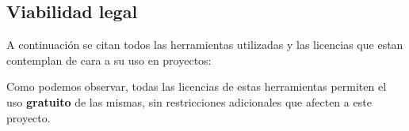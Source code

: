 \subsection{Viabilidad legal}
A continuación se citan todos las herramientas utilizadas y las licencias que estan contemplan de cara a su uso en proyectos:


Como podemos observar, todas las licencias de estas herramientas permiten el uso \textbf{gratuito} de las mismas, sin restricciones adicionales que afecten a este proyecto.